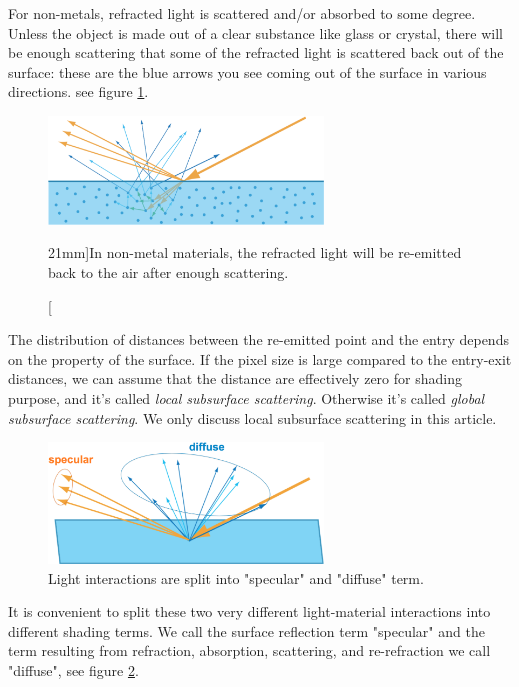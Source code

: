 For non-metals, refracted light is scattered and/or absorbed to some degree. Unless the object is made out of a clear substance like glass or crystal, there will be enough scattering that some of the refracted light is scattered back out of the surface: these are the blue arrows you see coming out of the surface in various directions. see figure \ref{f:refraction}.

\begin{figure}
\sidecaption
	\includegraphics[width=0.65\textwidth]{graphics/gi/ray-optics-5}
	\caption[][21mm]{In non-metal materials, the refracted light will be re-emitted back to the air after enough scattering.}
	\label{f:refraction}
\end{figure}

The distribution of distances between the re-emitted point and the entry depends on the property of the surface. If the pixel size is large compared to the entry-exit distances, we can assume that the distance are effectively zero for shading purpose, and it's called \textit{local subsurface scattering}. Otherwise it's called \textit{global subsurface scattering}. We only discuss local subsurface scattering in this article. 

\begin{figure}
\sidecaption
	\includegraphics[width=0.65\textwidth]{graphics/gi/ray-optics-6}
	\caption{Light interactions are split into "specular" and "diffuse" term.}
	\label{f:specular-and-diffuse}
\end{figure}

It is convenient to split these two very different light-material interactions into different shading terms. We call the surface reflection term "specular" and the term resulting from refraction, absorption, scattering, and re-refraction we call "diffuse", see figure \ref{f:specular-and-diffuse}.

